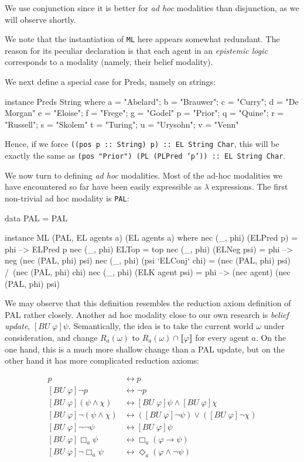 \documentclass[11pt]{article}
\theoremstyle{definition}
\newcommand{\IMPL}{\rightarrow}
\newcommand{\IFF}{\leftrightarrow}
\begin{document}
We use conjunction since it is better for \emph{ad hoc} modalities than disjunction, as we will observe shortly.

We note that the instantiation of \texttt{ML} here appears somewhat redundant.  The reason for its peculiar declaration is that each agent in an \emph{epistemic logic} corresponds to a modality (namely, their belief modality).

We next define a special case for Preds, namely on strings:
\begin{code}
instance Preds String where
  a = "Abelard"; b = "Brauwer"; c = "Curry"; d = "De Morgan"
  e = "Eloise"; f = "Frege"; g = "Godel"
  p = "Prior"; q = "Quine"; r = "Russell"; s = "Skolem"
  t = "Turing"; u = "Urysohn"; v = "Venn"
\end{code}

Hence, if we force \texttt{((pos p :: String) p) :: EL String Char}, this will be exactly the same as \texttt{(pos "Prior") (PL (PLPred 'p')) :: EL String Char}.

We now turn to defining \emph{ad hoc} modalities.  Most of the ad-hoc modalities we have encountered so far have been easily expressible as $\lambda$ expressions.  The first non-trivial ad hoc modality is \texttt{PAL}:

\begin{code}
data PAL = PAL

instance ML (PAL, EL agents a) (EL agents a) where
  nec (_, phi) (ELPred p) = phi --> ELPred p
  nec (_, phi) ELTop = top
  nec (_, phi) (ELNeg psi) = phi --> neg (nec (PAL, phi) psi)
  nec (_, phi) (psi `ELConj` chi) = 
      (nec (PAL, phi) psi) /\ (nec (PAL, phi) chi)
  nec (_, phi) (ELK agent psi) = phi --> (nec agent) (nec (PAL, phi) psi)
\end{code}

We may observe that this definition resembles the reduction axiom definition of \textsf{PAL} rather closely.  Another ad hoc modality close to our own research is \emph{belief update}, $[BU\; \varphi]\psi$.  Semantically, the idea is to take the current world $\omega$ under consideration, and change $R_a(\omega)$ to $R_a(\omega) \cap \llbracket \varphi \rrbracket$ for every agent $a$.  On the one hand, this is a much more shallow change than a \textsf{PAL} update, but on the other hand it has more complicated reduction axioms:

\begin{align*}
  [BU\; \varphi] p & \IFF p\\
  [BU\; \varphi] \neg p & \IFF \neg p\\
  [BU\; \varphi] (\psi \wedge \chi) & \IFF   [BU\; \varphi] \psi \wedge [BU\; \varphi] \chi\\
  [BU\; \varphi] \neg (\psi \wedge \chi) & \IFF ([BU\; \varphi] \neg \psi) \vee ([BU\; \varphi] \neg \chi)\\
  [BU\; \varphi] \neg \neg \psi  & \IFF [BU\; \varphi] \psi\\
  [BU\; \varphi] \Box_a \psi  & \IFF \Box_a (\varphi \IMPL \psi)\\
  [BU\; \varphi] \neg \Box_a \psi  & \IFF \Diamond_a (\varphi \wedge \neg \psi)
\end{align*}
\end{document}
